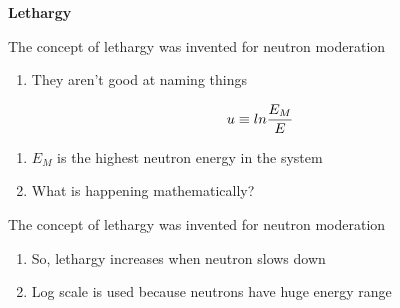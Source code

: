 \documentclass[aspectratio=1610,pdftex,dvipsnames,compress,xcolor={dvipsnames}]{beamer}
\begin{document}
\begin{frame}[plain]{}
    \centering\LARGE\textbf{Lethargy}
\end{frame}


\addtocounter{framenumber}{-1} 
\begin{frame}{The concept of lethargy was invented for neutron moderation}
    \begin{enumerate}[series=outerlist,topsep=0pt,itemsep=21pt,leftmargin=*,label=(\arabic*)]
        \item[]They aren't good at naming things
    \end{enumerate}

    \vspace*{\fill}

    \begin{equation}
        \LARGE
        u \equiv ln \frac{E_M}{E}
    \end{equation}

    \vspace*{\fill}

    \begin{enumerate}[series=outerlist,topsep=0pt,itemsep=21pt,leftmargin=*,label=(\arabic*)]
        \item[]$E_M$ is the highest neutron energy in the system
        \item[]What is happening mathematically?
    \end{enumerate}
\end{frame}


\begin{frame}{The concept of lethargy was invented for neutron moderation}
    \begin{enumerate}[series=outerlist,topsep=0pt,itemsep=21pt,leftmargin=*,label=(\arabic*)]
        \item[]So, lethargy increases when neutron slows down
        \item[]Log scale is used because neutrons have huge energy range
    \end{enumerate}
\end{frame}
\end{document}
